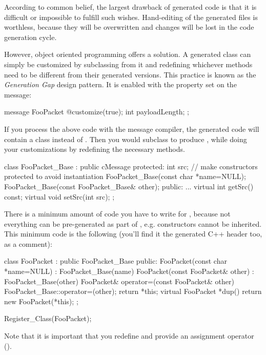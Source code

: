 According to common belief, the largest drawback of generated code
is that it is difficult or impossible to fulfill such wishes.
Hand-editing of the generated files is worthless, because
they will be overwritten and changes will be lost
in the code generation cycle.

However, object oriented programming offers a solution.
A generated class can simply be customized by subclassing
from it and redefining whichever methods need to be
different from their generated versions. This practice
is known as the \textit{Generation Gap} design pattern.
It is enabled with the  property set on the
message:

\begin{msg}
message FooPacket
{
   @customize(true);
   int payloadLength;
};
\end{msg}

If you process the above code with the message compiler,
the generated code will contain a  class
instead of . Then you would subclass
 to produce ,
while doing your customizations by redefining the necessary methods.

\begin{cpp}
class FooPacket_Base : public cMessage
{
  protected:
    int src;
    // make constructors protected to avoid instantiation
    FooPacket_Base(const char *name=NULL);
    FooPacket_Base(const FooPacket_Base& other);
  public:
    ...
    virtual int getSrc() const;
    virtual void setSrc(int src);
};
\end{cpp}

There is a minimum amount of code you have to write
for , because not everything can be
pre-generated as part of , e.g.
constructors cannot be inherited. This minimum
code is the following (you'll find it the generated C++ header
too, as a comment):

\begin{cpp}
class FooPacket : public FooPacket_Base
{
  public:
    FooPacket(const char *name=NULL) : FooPacket_Base(name) {}
    FooPacket(const FooPacket& other) : FooPacket_Base(other) {}
    FooPacket& operator=(const FooPacket& other)
        {FooPacket_Base::operator=(other); return *this;}
    virtual FooPacket *dup() {return new FooPacket(*this);}
};

Register_Class(FooPacket);
\end{cpp}

Note that it is important that you redefine  and
provide an assignment operator ().

